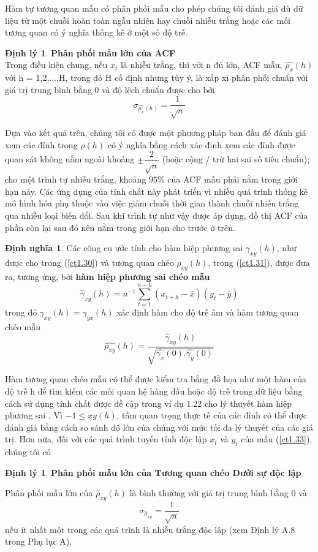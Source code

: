 \documentclass[12pt, a4paper,oneside]{book}
\theoremstyle{definition}
\newtheorem{dn}[theo]{Định nghĩa}
\newtheorem{dl}[theo]{Định lý}
\begin{document}
Hàm tự tương quan mẫu có phân phối mẫu cho phép chúng tôi đánh giá dù dữ liệu từ một chuỗi hoàn toàn ngẫu nhiên hay chuỗi nhiễu trắng hoặc các mối tương quan có ý nghĩa thống kê ở một số độ trễ.
\begin{dl}\textbf{Phân phối mẫu lớn của ACF}\\
Trong điều kiện chung, nếu $ x_{t}$ là nhiễu trắng, thì với n đủ lớn, ACF mẫu, $\hat{\rho_{x}}(h)$ với h = 1,2,...,H, trong đó H cố định nhưng tùy ý, là xấp xỉ phân phối chuẩn với giá trị trung bình bằng $0$ và độ lệch chuẩn được cho bởi
\begin{equation}
\sigma_{\hat{\rho_{x}}(h)}=\dfrac{1}{\sqrt{n}} \label{ct1.40}
\end{equation}
\end{dl}
Dựa vào kết quả trên, chúng tôi có được một phương pháp ban đầu để đánh giá xem các đỉnh trong $\rho(h)$ có ý nghĩa bằng cách xác định xem các đỉnh được quan sát không nằm ngoài khoảng $\pm\dfrac{2}{\sqrt{n}}$ (hoặc cộng / trừ hai sai số tiêu chuẩn); cho một trình tự nhiễu trắng, khoảng $95\%$ của ACF mẫu phải nằm trong giới hạn này. Các ứng dụng của tính chất này phát triển vì nhiều quá trình thống kê mô hình hóa phụ thuộc vào việc giảm chuỗi thời gian thành chuỗi nhiễu trắng qua nhiều loại biến đổi. Sau khi trình tự như vậy được áp dụng, đồ thị  ACF của phần còn lại sau đó nên nằm trong giới hạn cho trước ở trên.
\begin{dn}Các công cụ ước tính cho hàm hiệp phương sai $\gamma_{xy}(h)$, như được cho trong (\ref{ct1.30}) và tương quan chéo $\rho_{xy}(h)$, trong (\ref{ct1.31}), được đưa ra, tương ứng, bởi \textbf{hàm hiệp phương sai chéo mẫu}
\begin{equation}
\hat{\gamma}_{xy}(h)= n^{-1}\sum _ {t = 1 } ^ {n-h} (x_{t+h}-\bar{x})(y_{t}-\bar{y}) \label{ct1.41}	
\end{equation}
trong đó $\gamma_{xy}(h)= \gamma_{yx}(h)$ xác định hàm cho độ trễ âm và hàm tương quan chéo mẫu
\begin{equation}
	\hat{\rho_{xy}}(h)= \dfrac{\hat{\gamma}_{xy}(h)}{\sqrt{\hat{\gamma_{x}}(0).\hat{\gamma_{y}}(0)}} \label{ct1.42}
\end{equation}
\end{dn}
Hàm tương quan chéo mẫu có thể được kiểm tra bằng đồ họa như một hàm của độ trễ h để tìm kiếm các mối quan hệ hàng đầu hoặc độ trễ trong dữ liệu bằng cách sử dụng tính chất được đề cập trong ví dụ 1.22 cho lý thuyết hàm hiệp phương sai . Vì $-1\leqslant xy(h)$, tầm quan trọng thực tế của các đỉnh có thể được đánh giá bằng cách so sánh độ lớn của chúng với mức tối đa lý thuyết của các giá trị. Hơn nữa, đối với các quá trình tuyến tính độc lập $x_{t}$ và $y_{t}$ của mẫu (\ref{ct1.33}), chúng tôi có 
\begin{dl}
\textbf{Phân phối mẫu lớn của Tương quan chéo Dưới sự độc lập}\
	
Phân phối mẫu lớn của $\hat{\rho}_{xy}(h)$ là bình thường với giá trị trung bình bằng 0 và
\begin{equation}
\sigma_{\hat{\rho}_{xy}}=\dfrac{1}{\sqrt{n}} \label{ct1.43}
\end{equation} 
nếu ít nhất một trong các quá trình là nhiễu trắng độc lập (xem Định lý A.8 trong Phụ lục A).
\end{dl}
\end{document}

